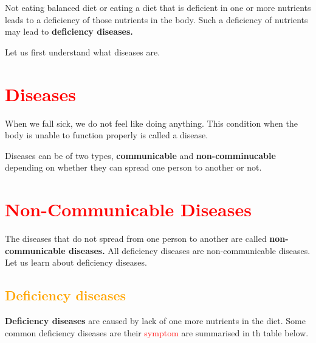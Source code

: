Not eating balanced diet or eating a diet that is deficient in one or more nutrients leads to a deficiency of those nutrients in the body. Such a deficiency  of nutrients may lead to \textbf{deficiency diseases.}\\
\par
Let us first understand what diseases are.\\

\section{\textcolor{red}{Diseases}}
When we fall sick, we do not feel like doing anything. This condition when the body is unable to function properly is called a disease. \\
\par
Diseases can be of two types, \textbf{communicable} and \textbf{non-comminucable} depending on whether they can spread one person to another or not.
\section{\textcolor{red}{Non-Communicable Diseases}}
The diseases that do not spread from one person to another are called \textbf{non-communicable diseases.} All deficiency diseases are non-communicable diseases. Let us learn about deficiency diseases.\\ 
\subsection{\textcolor{orange}{Deficiency diseases}}
\textbf{Deficiency diseases} are caused by lack of one more nutrients in the diet. Some common deficiency diseases are their \textcolor{red}{symptom} are summarised in th table below.\\

